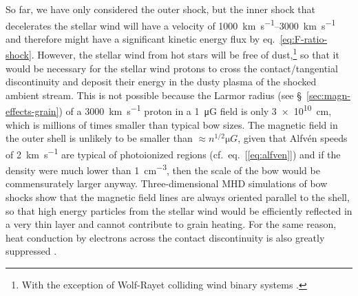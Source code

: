 So far, we have only considered the outer shock, but the inner shock
that decelerates the stellar wind will have a velocity of
\SIrange{1000}{3000}{km.s^{-1}} and therefore might have a
significant kinetic energy flux by eq.~\eqref{eq:F-ratio-shock}.
However, the stellar wind from hot stars will be free of
dust,\footnote{%
  With the exception of Wolf-Rayet colliding wind binary systems
  \citep{Tuthill:1999a, Callingham:2019a}.} %
so that it would be necessary for the stellar wind protons to cross
the contact/tangential discontinuity and deposit their energy in the
dusty plasma of the shocked ambient stream.  This is not possible
because the Larmor radius (see \S~\ref{sec:magn-effects-grain}) of a
\SI{3000}{km.s^{-1}} proton in a \SI{1}{\micro G} field is only
\SI{3e10}{cm}, which is millions of times smaller than typical bow
sizes.  The magnetic field in the outer shell is unlikely to be
smaller than \(\approx n^{1/2} \si{\micro G}\), given that Alfvén
speeds of \SI{2}{km.s^{-1}} are typical of photoionized regions
(cf.~eq.~[\ref{eq:alfven}]) and if the density were much lower than
\SI{1}{cm^{-3}}, then the scale of the bow would be commensurately
larger anyway.  Three-dimensional MHD simulations of bow shocks
\citep{Katushkina:2017a, Gvaramadze:2018a} show that the magnetic
field lines are always oriented parallel to the shell, so that high
energy particles from the stellar wind would be efficiently reflected
in a very thin layer and cannot contribute to grain heating.  For the
same reason, heat conduction by electrons across the contact
discontinuity is also greatly suppressed \citep{Meyer:2017a}.



